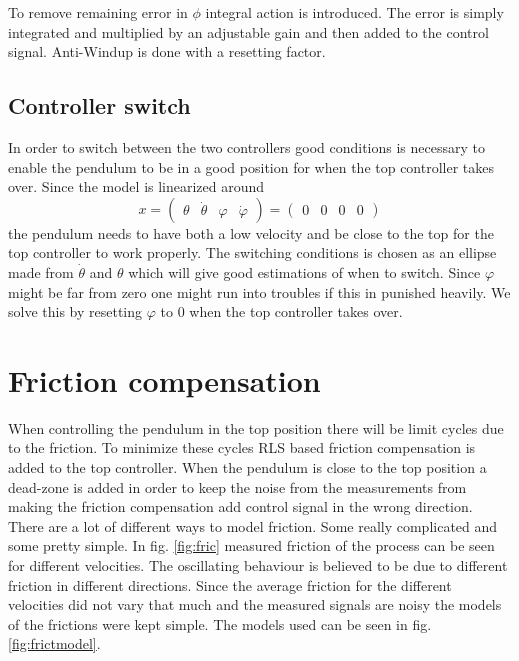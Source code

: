 \documentclass[10pt,a4paper]{article}
\begin{document}
To remove remaining error in $\phi$ integral action is introduced. The error is simply integrated and multiplied by an adjustable gain and then added to the control signal. Anti-Windup is done with a resetting factor.

\subsection{Controller switch}
In order to switch between the two controllers good conditions is necessary to enable the pendulum to be in a good position for when the top controller takes over. Since the model is linearized around 
$$x =
\begin{pmatrix}
\theta & \dot\theta & \varphi & \dot\varphi
\end{pmatrix} = 
\begin{pmatrix}
0 & 0 & 0 & 0
\end{pmatrix}$$
the pendulum needs to have both a low velocity and be close to the top for the top controller to work properly. The switching conditions is chosen as an ellipse made from $\dot\theta$ and $\theta$ which will give good estimations of when to switch. Since $ \varphi $ might be far from zero one might run into troubles if this in punished heavily. We solve this by resetting $ \varphi $ to $0$ when the top controller takes over.


\section{Friction compensation}
When controlling the pendulum in the top position there will be limit cycles due to the friction. To minimize these cycles RLS based friction compensation is added to the top controller. When the pendulum is close to the top position a dead-zone is added in order to keep the noise from the measurements from making the friction compensation add control signal in the wrong direction. There are a lot of different ways to model friction. Some really complicated and some pretty simple. In fig. \ref{fig:fric} measured friction of the process can be seen for different velocities. The oscillating behaviour is believed to be due to different friction in different directions. Since the average friction for the different velocities did not vary that much and the measured signals are noisy the models of the frictions were kept simple. The models used can be seen in fig. \ref{fig:frictmodel}. 
\end{document}

